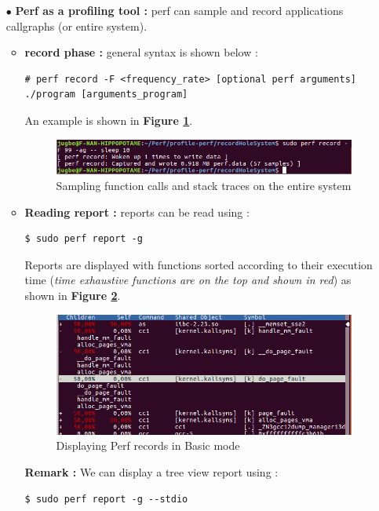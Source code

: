 \begin{itemize}
\begin{enumerate}
		\end{enumerate}

	\item[$\bullet$] \textbf{Perf as a profiling tool : } perf can sample and record  applications callgraphs (or entire system).
	
	\begin{itemize}
		\item \textbf{record phase : } general syntax is shown below :
	\begin{lstlisting}[style=BashInputStyle]
# perf record -F <frequency_rate> [optional perf arguments] ./program [arguments_program]
	\end{lstlisting}	
	
	
An example is shown in \textbf{Figure \ref{Sampling function calls and stack traces on  the entire system}}.	
					\begin{figure}[H]
						\centering
        				\includegraphics[scale=0.5]{img/solution/record-hole-system-perf.png}
        				\caption{Sampling function calls and stack traces on  the entire system}
        				\label{Sampling function calls and stack traces on  the entire system}
    				\end{figure}
    				
    				
    	\item \textbf{Reading report : } reports can be read using :
 	\begin{lstlisting}[style=BashInputStyle]   	
    	$ sudo perf report -g	
    \end{lstlisting}	
Reports are displayed with functions sorted according to their execution time
(\textit{time exhaustive functions are on the top and shown in red})  as shown in \textbf{Figure \ref{Displaying Perf records in Basic mode}}.			
					\begin{figure}[H]
						\centering
        				\includegraphics[scale=0.55]{img/solution/basic-display-record-mode-perf.png}
        				\caption{Displaying Perf records in Basic mode}
        				\label{Displaying Perf records in Basic mode}
    				\end{figure}
 \textbf{Remark : } We can display a tree view report using : 
 	\begin{lstlisting}[style=BashInputStyle]   	
    	$ sudo perf report -g --stdio 
    \end{lstlisting} 
   				

\end{itemize}
\end{itemize}
